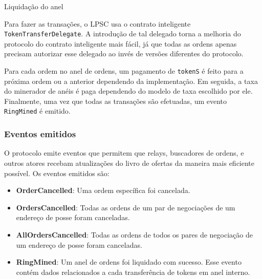 \documentclass[UTF8,nofonts]{article}
\makeatletter
\newenvironment{figurehere}
 {\def\@captype{figure}}
 {}
\makeatother
\begin{document}
\begin{multicols}{2}
\begin{center}
\begin{figurehere}
\centering
{}
\caption{Liquidação do anel}
\label{fig:settlement}
\end{figurehere}
\end{center}

Para fazer as transações, o LPSC usa o contrato inteligente \verb|TokenTransferDelegate|. A introdução de tal delegado torna a melhoria do protocolo do contrato inteligente mais fácil, já que todas as ordens apenas precisam autorizar esse delegado ao invés de versões diferentes do protocolo.

Para cada ordem no anel de ordens, um pagamento de \verb|tokenS| é feito para a próxima ordem ou a anterior dependendo da implementação. Em seguida, a taxa do minerador de anéis é paga dependendo do modelo de taxa escolhido por ele. Finalmente, uma vez que todas as transações são efetuadas, um evento \verb|RingMined| é emitido.

\subsubsection{Eventos emitidos\label{sec:events}}
O protocolo emite eventos que permitem que relays, buscadores de ordens, e outros atores recebam atualizações do livro de ofertas da maneira mais eficiente possível. Os eventos emitidos são:

\begin{itemize}
	\item \textbf{OrderCancelled}: Uma ordem específica foi cancelada.
	\item \textbf{OrdersCancelled}: Todas as ordens de um par de negociações de um endereço de posse foram canceladas.
	\item \textbf{AllOrdersCancelled}: Todas as ordens de todos os pares de negociação  de um endereço de posse foram canceladas.
	\item \textbf{RingMined}: Um anel de ordens foi liquidado com sucesso. Esse evento contém dados relacionados a cada transferência de tokens em anel interno.
\end{itemize}


\end{multicols}
\end{document}
